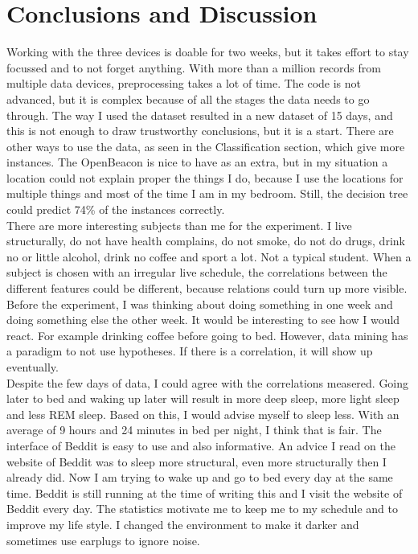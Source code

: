 \section{Conclusions and Discussion}
	Working with the three devices is doable for two weeks, but it takes effort to stay focussed and to not forget anything. With more than a million records from multiple data devices, preprocessing takes a lot of time. The code is not advanced, but it is complex because of all the stages the data needs to go through. The way I used the dataset resulted in a new dataset of 15 days, and this is not enough to draw trustworthy conclusions, but it is a start. There are other ways to use the data, as seen in the Classification section, which give more instances. The OpenBeacon is nice to have as an extra, but in my situation a location could not explain proper the things I do, because I use the locations for multiple things and most of the time I am in my bedroom. Still, the decision tree could predict 74\% of the instances correctly.
	\\
	There are more interesting subjects than me for the experiment. I live structurally, do not have health complains, do not smoke, do not do drugs, drink no or little alcohol, drink no coffee and sport a lot. Not a typical student. When a subject is chosen with an irregular live schedule, the correlations between the different features could be different, because relations could turn up more visible. Before the experiment, I was thinking about doing something in one week and doing something else the other week. It would be interesting to see how I would react. For example drinking coffee before going to bed. However, data mining has a paradigm to not use hypotheses. If there is a correlation, it will show up eventually.
	\\
	Despite the few days of data, I could agree with the correlations measered. Going later to bed and waking up later will result in more deep sleep, more light sleep and less REM sleep. Based on this, I would advise myself to sleep less. With an average of 9 hours and 24 minutes in bed per night, I think that is fair. The interface of Beddit is easy to use and also informative. An advice I read on the website of Beddit was to sleep more structural, even more structurally then I already did. Now I am trying to wake up and go to bed every day at the same time. Beddit is still running at the time of writing this and I visit the website of Beddit every day. The statistics motivate me to keep me to my schedule and to improve my life style. I changed the environment to make it darker and sometimes use earplugs to ignore noise. 
